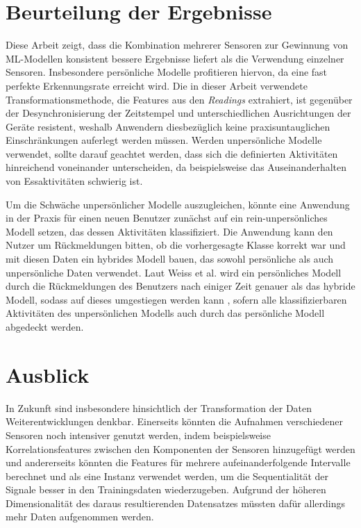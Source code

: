 \section{Beurteilung der Ergebnisse}
Diese Arbeit zeigt, dass die Kombination mehrerer Sensoren zur Gewinnung von \acs{ML}-Modellen konsistent bessere Ergebnisse liefert als die Verwendung einzelner Sensoren. Insbesondere persönliche Modelle profitieren hiervon, da eine fast perfekte Erkennungsrate erreicht wird. Die in dieser Arbeit verwendete Transformationsmethode, die Features aus den \textit{Readings} extrahiert, ist gegenüber der Desynchronisierung der Zeitstempel und unterschiedlichen Ausrichtungen der Geräte resistent, weshalb Anwendern diesbezüglich keine praxisuntauglichen Einschränkungen auferlegt werden müssen. Werden unpersönliche Modelle verwendet, sollte darauf geachtet werden, dass sich die definierten Aktivitäten hinreichend voneinander unterscheiden, da beispielsweise das Auseinanderhalten von Essaktivitäten schwierig ist.

Um die Schwäche unpersönlicher Modelle auszugleichen, könnte eine Anwendung in der Praxis für einen neuen Benutzer zunächst auf ein rein-unpersönliches Modell setzen, das dessen Aktivitäten klassifiziert. Die Anwendung kann den Nutzer um Rückmeldungen bitten, ob die vorhergesagte Klasse korrekt war und mit diesen Daten ein hybrides Modell bauen, das sowohl persönliche als auch unpersönliche Daten verwendet. Laut Weiss et al. wird ein persönliches Modell durch die Rückmeldungen des Benutzers nach einiger Zeit genauer als das hybride Modell, sodass auf dieses umgestiegen werden kann \cite{Weiss2012}, sofern alle klassifizierbaren Aktivitäten des unpersönlichen Modells auch durch das persönliche Modell abgedeckt werden.

\section{Ausblick}
In Zukunft sind insbesondere hinsichtlich der Transformation der Daten Weiterentwicklungen denkbar. Einerseits könnten die Aufnahmen verschiedener Sensoren noch intensiver genutzt werden, indem beispielsweise Korrelationsfeatures zwischen den Komponenten der Sensoren hinzugefügt werden und andererseits könnten die Features für mehrere aufeinanderfolgende Intervalle berechnet und als eine Instanz verwendet werden, um die Sequentialität der Signale besser in den Trainingsdaten wiederzugeben. Aufgrund der höheren Dimensionalität des daraus resultierenden Datensatzes müssten dafür allerdings mehr Daten aufgenommen werden.

